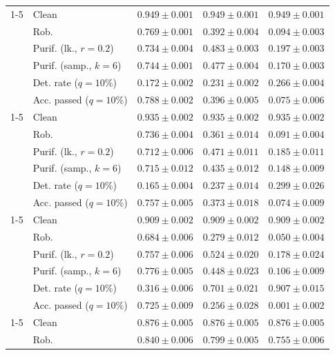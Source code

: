 \begin{table}[htbp]
\begin{tabular}{@{}llrrr@{}}
\cmidrule(lr){1-5}
\multirow{6}{*}{$\alpha{=}0.2$} & Clean & $0.949 \pm 0.001$ & $0.949 \pm 0.001$ & $0.949 \pm 0.001$ \\
 & Rob. & $0.769 \pm 0.001$ & $0.392 \pm 0.004$ & $0.094 \pm 0.003$ \\
 & Purif. (lk., $r=0.2$) & $0.734 \pm 0.004$ & $0.483 \pm 0.003$ & $0.197 \pm 0.003$ \\
 & Purif. (samp., $k=6$) & $0.744 \pm 0.001$ & $0.477 \pm 0.004$ & $0.170 \pm 0.003$ \\
 & Det. rate ($q=10\%$) & $0.172 \pm 0.002$ & $0.231 \pm 0.002$ & $0.266 \pm 0.004$ \\
 & Acc. passed ($q=10\%$) & $0.788 \pm 0.002$ & $0.396 \pm 0.005$ & $0.075 \pm 0.006$ \\
\cmidrule(lr){1-5}
\multirow{6}{*}{$\alpha{=}0.5$} & Clean & $0.935 \pm 0.002$ & $0.935 \pm 0.002$ & $0.935 \pm 0.002$ \\
 & Rob. & $0.736 \pm 0.004$ & $0.361 \pm 0.014$ & $0.091 \pm 0.004$ \\
 & Purif. (lk., $r=0.2$) & $0.712 \pm 0.006$ & $0.471 \pm 0.011$ & $0.185 \pm 0.011$ \\
 & Purif. (samp., $k=6$) & $0.715 \pm 0.012$ & $0.435 \pm 0.012$ & $0.148 \pm 0.009$ \\
 & Det. rate ($q=10\%$) & $0.165 \pm 0.004$ & $0.237 \pm 0.014$ & $0.299 \pm 0.026$ \\
 & Acc. passed ($q=10\%$) & $0.757 \pm 0.005$ & $0.373 \pm 0.018$ & $0.074 \pm 0.009$ \\
\cmidrule(lr){1-5}
\multirow{6}{*}{$\alpha{=}1$} & Clean & $0.909 \pm 0.002$ & $0.909 \pm 0.002$ & $0.909 \pm 0.002$ \\
 & Rob. & $0.684 \pm 0.006$ & $0.279 \pm 0.012$ & $0.050 \pm 0.004$ \\
 & Purif. (lk., $r=0.2$) & $0.757 \pm 0.006$ & $0.524 \pm 0.020$ & $0.178 \pm 0.024$ \\
 & Purif. (samp., $k=6$) & $0.776 \pm 0.005$ & $0.448 \pm 0.023$ & $0.106 \pm 0.009$ \\
 & Det. rate ($q=10\%$) & $0.316 \pm 0.006$ & $\mathbf{0.701 \pm 0.021}$ & $\mathbf{0.907 \pm 0.015}$ \\
 & Acc. passed ($q=10\%$) & $0.725 \pm 0.009$ & $0.256 \pm 0.028$ & $0.001 \pm 0.002$ \\
\cmidrule(lr){1-5}
\multirow{6}{*}{AT} & Clean & $0.876 \pm 0.005$ & $0.876 \pm 0.005$ & $0.876 \pm 0.005$ \\
 & Rob. & $0.840 \pm 0.006$ & $\mathbf{0.799 \pm 0.005}$ & $\mathbf{0.755 \pm 0.006}$ \\

\end{tabular}
\end{table}
